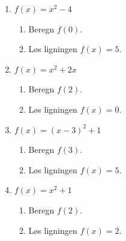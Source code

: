 \documentclass[10pt,a4paper,table]{article}
\begin{document}
\begin{enumerate}
  \item $f(x) = x^2 - 4$
  \begin{enumerate}
    \item Beregn $f(0)$.
    \item Løs ligningen $f(x)=5$.
  \end{enumerate}

  \item $f(x) = x^2 + 2x$
  \begin{enumerate}
    \item Beregn $f(2)$.
    \item Løs ligningen $f(x)=0$.
  \end{enumerate}

  \item $f(x) = (x-3)^2 + 1$
  \begin{enumerate}
    \item Beregn $f(3)$.
    \item Løs ligningen $f(x)=5$.
  \end{enumerate}

  \item $f(x) = x^2 + 1$
  \begin{enumerate}
    \item Beregn $f(2)$.
    \item Løs ligningen $f(x)=2$.
  \end{enumerate}
\end{enumerate}
\end{document}
